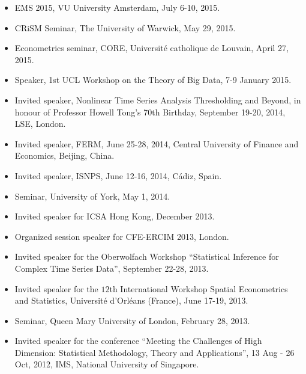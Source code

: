 \documentclass[overlapped,line,letterpaper]{res}
\begin{document}
\begin{resume}
\begin{itemize}
\item[$\bullet$] EMS 2015, VU University Amsterdam, July 6-10, 2015.


\item[$\bullet$] CRiSM Seminar, The University of Warwick, May 29, 2015.


\item[$\bullet$] Econometrics seminar, CORE, Universit\'{e} catholique de Louvain, April 27, 2015.

\item[$\bullet$] Speaker, 1st UCL Workshop on the Theory of Big Data,
7-9 January 2015.


\item[$\bullet$] Invited speaker, Nonlinear Time Series Analysis
Thresholding and Beyond, in honour of
Professor Howell Tong’s 70th Birthday, September 19-20, 2014, LSE, London.

\item[$\bullet$] Invited speaker, FERM, June 25-28, 2014, Central University of Finance and Economics, Beijing, China.

\item[$\bullet$] Invited speaker, ISNPS, June 12-16, 2014, C\'{a}diz, Spain.

\item[$\bullet$] Seminar, University of York, May 1, 2014.

\item[$\bullet$] Invited speaker for ICSA Hong Kong, December 2013.

\item[$\bullet$] Organized session speaker for CFE-ERCIM 2013, London.

\item[$\bullet$] Invited speaker for the Oberwolfach Workshop ``Statistical Inference for Complex Time Series Data'', September 22-28, 2013.

\item[$\bullet$] Invited speaker for the $12$th International Workshop Spatial Econometrics and Statistics, Universit\'{e} d'Orl\'{e}ans (France), June 17-19, 2013.

\item[$\bullet$] Seminar, Queen Mary University of London, February 28, 2013.\\

\item[$\bullet$] Invited speaker for the conference ``Meeting the Challenges of High Dimension: Statistical Methodology, Theory and Applications'', 13 Aug - 26 Oct, 2012, IMS, National University of Singapore. \\


\end{itemize}
\end{resume}
\end{document}
